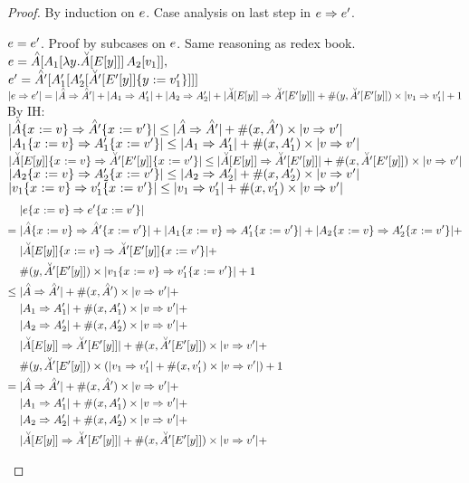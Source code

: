 \documentclass{article}
\begin{document}
\renewcommand{\eone}{\inAp{\ap{\inA[_1]{\ly\inAm{\Ey}}}{\inA[_2]{\val_1}}}}
\renewcommand{\etwo}{\inAp[']{\inA[_1']{\inA[_2']{\substy{\inAm[']{\Ey[']}}{\val_1'}}}}}
\begin{proof}
By induction on $\e$. Case analysis on last step in $\e \pstep \e'$.
\begin{byCases}
  $\e = \e'$. Proof by subcases on $\e$. Same reasoning as redex book.
  $\e = \inAp{\ap{\inA[_1]{\ly\inAm{\Ey}}}{\inA[_2]{\val_1}}},$\\
  $\e' = \inAp[']{\inA[_1']{\inA[_2']{\substy{\inAm[']{\Ey[']}}{\val_1'}}}}$\\
  $\size{\e \pstep \e'} = \size{\Ap \pstep \Ap'} + \size{\A_1 \pstep \A_1'} +
    \size{\A_2 \pstep A_2'} + \size{\inAm{\Ey} \pstep \inAm[']{\Ey[']}} + 
    \numfv{y}{\inAm[']{\Ey[']}} \times \size{\val_1 \pstep \val_1'} + 1$ \\
  By IH:\\
  $\sizeIH{\Ap}{\Ap'}$ \\
  $\sizeIH{\A_1}{\A_1'}$ \\
  $\sizeIH{\inAm{\Ey}}{\inAm[']{\Ey[']}}$ \\
  $\sizeIH{\A_2}{\A_2'}$ \\
  $\sizeIH{\val_1}{\val_1'}$ 
  \begin{align*}
    &\size{\substx{\e}{\val} \pstep \substx{\e'}{\val'}}  \\
    =\; &\sizesubstx{\Ap}{\Ap'} + \sizesubstx{\A_1}{\A_1'} + 
         \sizesubstx{\A_2}{\A_2'} + \\
        &\sizesubstx{\inAm{\Ey}}{\inAm[']{\Ey[']}} + \\
        &\numfvy{\inAm[']{\Ey[']}} \times \sizesubstx{\val_1}{\val_1'} + 1 \\
 \leq\; &\sizeRHS{\Ap}{\Ap'} + \\ 
        &\sizeRHS{\A_1}{\A_1'} + \\
        &\sizeRHS{\A_2}{\A_2'} + \\
        &\sizeRHS{\inAm{\Ey}}{\inAm[']{\Ey[']}} + \\
        &\numfvy{\inAm[']{\Ey[']}} \times (\sizeRHS{\val_1}{\val_1'}) + 1 \\
    =\; &\sizeRHS{\Ap}{\Ap'} + \\
        &\sizeRHS{\A_1}{\A_1'} + \\
        &\sizeRHS{\A_2}{\A_2'} + \\
        &\sizeRHS{\inAm{\Ey}}{\inAm[']{\Ey[']}} + \\

\end{align*}
\end{byCases}
\end{proof}
\end{document}
